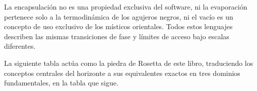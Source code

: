 \noindent {}

La encapsulación no es una propiedad exclusiva del software, ni la evaporación pertenece solo a la termodinámica de los agujeros negros, ni el vacío es un concepto de uso exclusivo de los místicos orientales. Todos estos lenguajes describen las mismas transiciones de fase y límites de acceso bajo escalas diferentes.

La siguiente tabla actúa como la piedra de Rosetta de este libro, traduciendo los conceptos centrales del horizonte a sus equivalentes exactos en tres dominios fundamentales, en la tabla que sigue.

